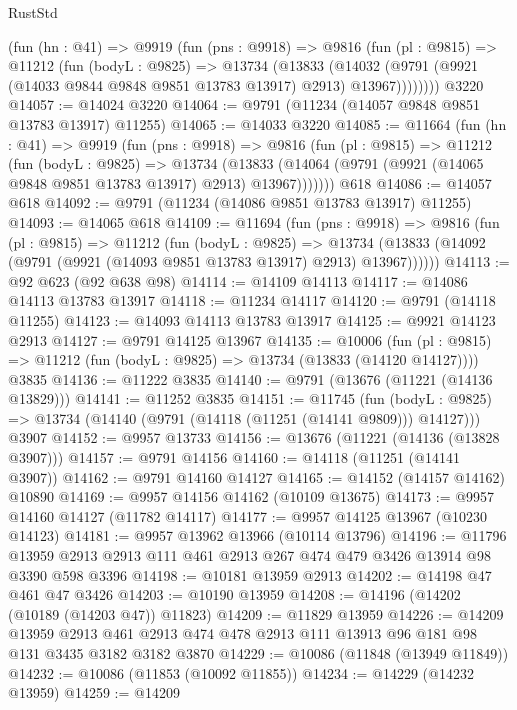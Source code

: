 \begin{lexlean}{RustStd}
\begin{coremodule}
      (fun (hn : @41) =>
      @9919
        (fun (pns : @9918) =>
        @9816
          (fun (pl : @9815) =>
          @11212
            (fun (bodyL : @9825) =>
            @13734
              (@13833
                (@14032 (@9791 (@9921 (@14033 @9844 @9848 @9851 @13783 @13917) @2913) @13967))))))))
    @3220
@14057 := @14024 @3220
@14064 := @9791 (@11234 (@14057 @9848 @9851 @13783 @13917) @11255)
@14065 := @14033 @3220
@14085 := @11664
    (fun (hn : @41) =>
    @9919
      (fun (pns : @9918) =>
      @9816
        (fun (pl : @9815) =>
        @11212
          (fun (bodyL : @9825) =>
          @13734
            (@13833 (@14064 (@9791 (@9921 (@14065 @9848 @9851 @13783 @13917) @2913) @13967)))))))
    @618
@14086 := @14057 @618
@14092 := @9791 (@11234 (@14086 @9851 @13783 @13917) @11255)
@14093 := @14065 @618
@14109 := @11694
    (fun (pns : @9918) =>
    @9816
      (fun (pl : @9815) =>
      @11212
        (fun (bodyL : @9825) =>
        @13734 (@13833 (@14092 (@9791 (@9921 (@14093 @9851 @13783 @13917) @2913) @13967))))))
@14113 := @92 @623 (@92 @638 @98)
@14114 := @14109 @14113
@14117 := @14086 @14113 @13783 @13917
@14118 := @11234 @14117
@14120 := @9791 (@14118 @11255)
@14123 := @14093 @14113 @13783 @13917
@14125 := @9921 @14123 @2913
@14127 := @9791 @14125 @13967
@14135 := @10006
    (fun (pl : @9815) => @11212 (fun (bodyL : @9825) => @13734 (@13833 (@14120 @14127))))
    @3835
@14136 := @11222 @3835
@14140 := @9791 (@13676 (@11221 (@14136 @13829)))
@14141 := @11252 @3835
@14151 := @11745
    (fun (bodyL : @9825) => @13734 (@14140 (@9791 (@14118 (@11251 (@14141 @9809))) @14127)))
    @3907
@14152 := @9957 @13733
@14156 := @13676 (@11221 (@14136 (@13828 @3907)))
@14157 := @9791 @14156
@14160 := @14118 (@11251 (@14141 @3907))
@14162 := @9791 @14160 @14127
@14165 := @14152 (@14157 @14162) @10890
@14169 := @9957 @14156 @14162 (@10109 @13675)
@14173 := @9957 @14160 @14127 (@11782 @14117)
@14177 := @9957 @14125 @13967 (@10230 @14123)
@14181 := @9957 @13962 @13966 (@10114 @13796)
@14196 := @11796 @13959 @2913 @2913 @111 @461 @2913 @267 @474 @479 @3426 @13914 @98 @3390 @598 @3396
@14198 := @10181 @13959 @2913
@14202 := @14198 @47 @461 @47 @3426
@14203 := @10190 @13959
@14208 := @14196 (@14202 (@10189 (@14203 @47)) @11823)
@14209 := @11829 @13959
@14226 := @14209
    @13959
    @2913
    @461
    @2913
    @474
    @478
    @2913
    @111
    @13913
    @96
    @181
    @98
    @131
    @3435
    @3182
    @3182
    @3870
@14229 := @10086 (@11848 (@13949 @11849))
@14232 := @10086 (@11853 (@10092 @11855))
@14234 := @14229 (@14232 @13959)
@14259 := @14209

\end{coremodule}
\end{lexlean}
